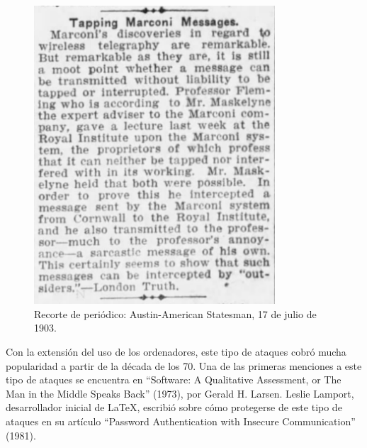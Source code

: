 \documentclass[11pt]{article}
\begin{document}
\begin{figure}[H]
	\centering
	\includegraphics[width=90mm]{images/memoir/marconi-paper}
	\caption{Recorte de periódico: Austin-American Statesman, 17 de julio de 1903.}
\end{figure}

Con la extensión del uso de los ordenadores, este tipo de ataques cobró mucha popularidad a partir de la década de los 70. Una de las
primeras menciones a este tipo de ataques se encuentra en ``Software: A Qualitative Assessment, or The Man in the Middle Speaks Back'' (1973), por
Gerald H. Larsen. Leslie Lamport, desarrollador inicial de \LaTeX, escribió sobre cómo protegerse de este tipo de ataques en su artículo
``Password Authentication with Insecure Communication'' (1981).
\end{document}
